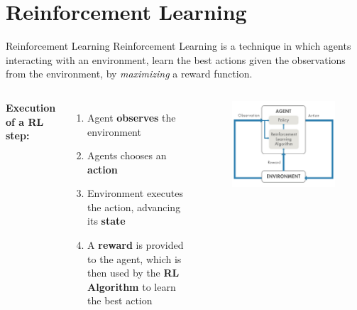 \documentclass[10pt, xcolor={dvipsnames}]{beamer}
\begin{document}
\section{Reinforcement Learning}
\begin{frame}{Reinforcement Learning}
    Reinforcement Learning is a technique in which
    \alert{agents} interacting with an \alert{environment}, learn the best \alert{actions} given the \alert{observations} from the environment, by \textit{maximizing} a \alert{reward function}. 
    \vspace{0.5cm}
    \begin{columns}

        \textbf{Execution of a RL step:}
        \begin{enumerate}
            \item Agent \textbf{observes} the environment
            \item Agents chooses an \textbf{action}
            \item Environment executes the action, advancing its \textbf{state}
            \item A \textbf{reward} is provided to the agent, which is then used by the \textbf{RL Algorithm} to learn the best action
        \end{enumerate}
        \begin{figure}
            \centering
            \includegraphics[width=1\textwidth]{assets/rl/rl.png}
        \end{figure}
    \end{columns}
\end{frame}
\end{document}
